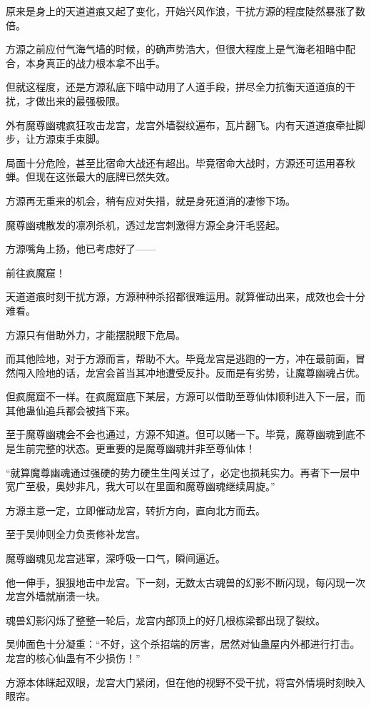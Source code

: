 \begin{this_body}
原来是身上的天道道痕又起了变化，开始兴风作浪，干扰方源的程度陡然暴涨了数倍。

方源之前应付气海气墙的时候，的确声势浩大，但很大程度上是气海老祖暗中配合，本身真正的战力根本拿不出手。

但就这程度，还是方源私底下暗中动用了人道手段，拼尽全力抗衡天道道痕的干扰，才做出来的最强极限。

外有魔尊幽魂疯狂攻击龙宫，龙宫外墙裂纹遍布，瓦片翻飞。内有天道道痕牵扯脚步，让方源束手束脚。

局面十分危险，甚至比宿命大战还有超出。毕竟宿命大战时，方源还可运用春秋蝉。但现在这张最大的底牌已然失效。

方源再无重来的机会，稍有应对失措，就是身死道消的凄惨下场。

魔尊幽魂散发的凛冽杀机，透过龙宫刺激得方源全身汗毛竖起。

方源嘴角上扬，他已考虑好了——

前往疯魔窟！

天道道痕时刻干扰方源，方源种种杀招都很难运用。就算催动出来，成效也会十分难看。

方源只有借助外力，才能摆脱眼下危局。

而其他险地，对于方源而言，帮助不大。毕竟龙宫是逃跑的一方，冲在最前面，冒然闯入险地的话，龙宫会首当其冲地遭受反扑。反而是有劣势，让魔尊幽魂占优。

但疯魔窟不一样。在疯魔窟底下某层，方源可以借助至尊仙体顺利进入下一层，而其他蛊仙追兵都会被挡下来。

至于魔尊幽魂会不会也通过，方源不知道。但可以赌一下。毕竟，魔尊幽魂到底不是生前完整的状态。更重要的是魔尊幽魂并非至尊仙体！

“就算魔尊幽魂通过强硬的势力硬生生闯关过了，必定也损耗实力。再者下一层中宽广至极，奥妙非凡，我大可以在里面和魔尊幽魂继续周旋。”

方源主意一定，立即催动龙宫，转折方向，直向北方而去。

至于吴帅则全力负责修补龙宫。

魔尊幽魂见龙宫逃窜，深呼吸一口气，瞬间逼近。

他一伸手，狠狠地击中龙宫。下一刻，无数太古魂兽的幻影不断闪现，每闪现一次龙宫外墙就崩溃一块。

魂兽幻影闪烁了整整一轮后，龙宫内部顶上的好几根栋梁都出现了裂纹。

吴帅面色十分凝重：“不好，这个杀招端的厉害，居然对仙蛊屋内外都进行打击。龙宫的核心仙蛊有不少损伤！”

方源本体眯起双眼，龙宫大门紧闭，但在他的视野不受干扰，将宫外情境时刻映入眼帘。


\end{this_body}
